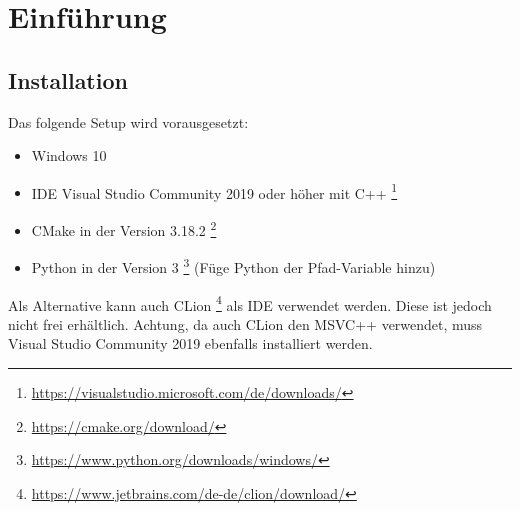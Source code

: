 \newpage
\chapter{Einführung}
\section{Installation}
Das folgende Setup wird vorausgesetzt:
\begin{itemize}
    \item Windows 10
    \item \gls{IDE} Visual Studio Community 2019 oder höher mit C++ \footnote{\url{https://visualstudio.microsoft.com/de/downloads/}}
    \item \gls{CMake} in der Version 3.18.2 \footnote{\url{https://cmake.org/download/}}
    \item \gls{Python} in der Version 3 \footnote{\url{https://www.python.org/downloads/windows/}} (Füge Python der Pfad-Variable hinzu)
\end{itemize}
Als Alternative kann auch CLion \footnote{\url{https://www.jetbrains.com/de-de/clion/download/}} als IDE verwendet werden.
Diese ist jedoch nicht frei erhältlich. Achtung, da auch CLion den MSVC++ verwendet, muss Visual Studio Community 2019
ebenfalls installiert werden.


\newpage

\newpage
